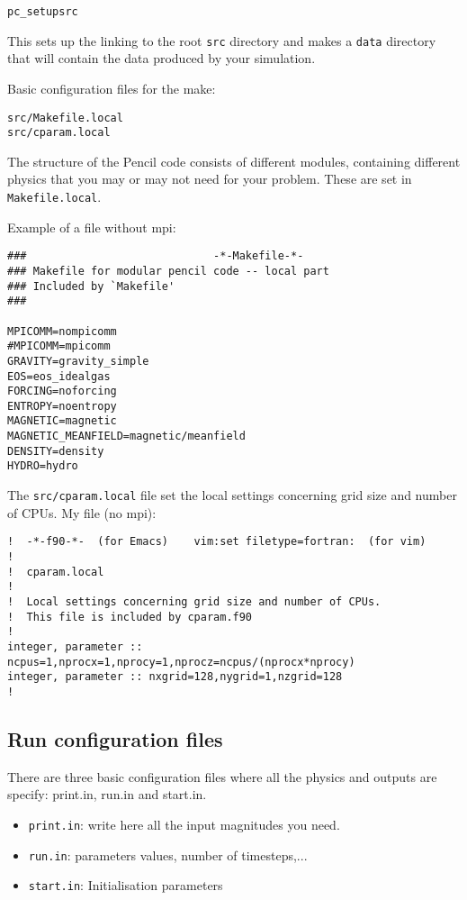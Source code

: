 \documentclass[a4paper,12pt]{article}
\begin{document}
\begin{verbatim}
pc_setupsrc
\end{verbatim}
This sets up the linking to the root \verb|src| directory and makes a
\verb|data| directory that will contain the data produced by your simulation.

Basic configuration files for the make:
\begin{verbatim}
src/Makefile.local
src/cparam.local
\end{verbatim}

The structure of the Pencil code consists of different modules, containing
different physics that you may or may not need for your problem. These are set
in \verb|Makefile.local|. 

Example of a file without mpi:
\begin{verbatim}
###                             -*-Makefile-*-
### Makefile for modular pencil code -- local part
### Included by `Makefile'
###

MPICOMM=nompicomm
#MPICOMM=mpicomm
GRAVITY=gravity_simple
EOS=eos_idealgas
FORCING=noforcing
ENTROPY=noentropy
MAGNETIC=magnetic
MAGNETIC_MEANFIELD=magnetic/meanfield
DENSITY=density
HYDRO=hydro
\end{verbatim}

The \texttt{src/cparam.local} file set the local settings concerning grid size
and number of CPUs. My file (no mpi):
\begin{verbatim}
!  -*-f90-*-  (for Emacs)    vim:set filetype=fortran:  (for vim)
!
!  cparam.local
!
!  Local settings concerning grid size and number of CPUs.
!  This file is included by cparam.f90
!
integer, parameter :: ncpus=1,nprocx=1,nprocy=1,nprocz=ncpus/(nprocx*nprocy)
integer, parameter :: nxgrid=128,nygrid=1,nzgrid=128
!
\end{verbatim}

\subsection{Run configuration files}

There are three basic configuration files where all the physics and outputs are specify: print.in, run.in and start.in.
\begin{itemize}
 \item \verb|print.in|: write here all the input magnitudes you need.
  \item \verb|run.in|: parameters values, number of timesteps,...
  \item \verb|start.in|: Initialisation parameters
\end{itemize}
\end{document}
